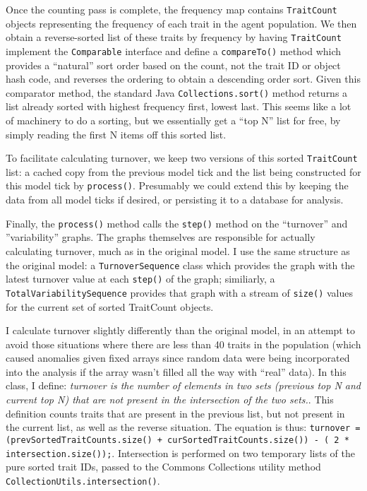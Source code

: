 \documentclass{kluwer-mem-copyright}
\begin{document}
\begin{article}
Once the counting pass is complete, the frequency map contains
\texttt{TraitCount} objects representing the frequency of each trait in the
agent population.  We then obtain a reverse-sorted list of these traits by
frequency by having \texttt{TraitCount} implement the \texttt{Comparable}
interface and define a \texttt{compareTo()} method which provides a ``natural''
sort order based on the count, not the trait ID or object hash code, and
reverses the ordering to obtain a descending order sort.  Given this comparator
method, the standard Java \texttt{Collections.sort()} method returns a list
already sorted with highest frequency first, lowest last.  This seems like a lot
of machinery to do a sorting, but we essentially get a ``top N'' list for free,
by simply reading the first N items off this sorted list.

To facilitate calculating turnover, we keep two versions of this sorted
\texttt{TraitCount} list:  a cached copy from the previous model tick and the
list being constructed for this model tick by \texttt{process()}.  Presumably we
could extend this by keeping the data from all model ticks if desired, or
persisting it to a database for analysis.  

Finally, the \texttt{process()} method calls the \texttt{step()} method on the
``turnover'' and ''variability'' graphs. The graphs
themselves are responsible for actually calculating turnover, much as in the original
model.  I use the same structure as the original model:  a
\texttt{TurnoverSequence} class which provides the graph with the latest
turnover value at each \texttt{step()} of the graph; similiarly, a
\texttt{TotalVariabilitySequence} provides that graph with a stream of
\texttt{size()} values for the current set of sorted TraitCount objects.

I calculate turnover slightly differently than the original model, in an attempt
to avoid those situations where there are less than 40 traits in the population
(which caused anomalies given fixed arrays since random data were being
incorporated into the analysis if the array wasn't filled all the way with
``real'' data).  In this class, I define:  \emph{turnover is the number of
elements in two sets (previous top N and current top N) that are not present in
the intersection of the two sets.}.  This definition counts traits that are
present in the previous list, but not present in the current list, as well as
the reverse situation.  The equation is thus:  
\texttt{turnover = (prevSortedTraitCounts.size() + curSortedTraitCounts.size())
- ( 2 * intersection.size());}.  Intersection is performed on two temporary
lists of the pure sorted trait IDs, passed to the Commons Collections utility
method\\ \texttt{CollectionUtils.intersection()}.  


\end{article}
\end{document}
